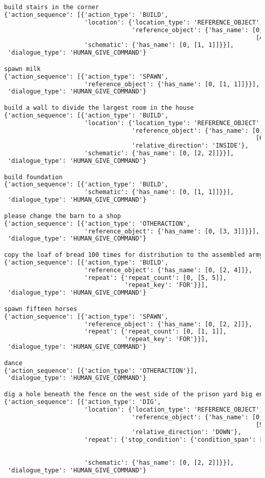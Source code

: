 \begin{lstlisting}[language=TeX]
build stairs in the corner
{'action_sequence': [{'action_type': 'BUILD',
                      'location': {'location_type': 'REFERENCE_OBJECT',
                                   'reference_object': {'has_name': [0,
                                                                     [4, 4]]}},
                      'schematic': {'has_name': [0, [1, 1]]}}],
 'dialogue_type': 'HUMAN_GIVE_COMMAND'}

spawn milk
{'action_sequence': [{'action_type': 'SPAWN',
                      'reference_object': {'has_name': [0, [1, 1]]}}],
 'dialogue_type': 'HUMAN_GIVE_COMMAND'}

build a wall to divide the largest room in the house
{'action_sequence': [{'action_type': 'BUILD',
                      'location': {'location_type': 'REFERENCE_OBJECT',
                                   'reference_object': {'has_name': [0,
                                                                     [6, 10]]},
                                   'relative_direction': 'INSIDE'},
                      'schematic': {'has_name': [0, [2, 2]]}}],
 'dialogue_type': 'HUMAN_GIVE_COMMAND'}

build foundation
{'action_sequence': [{'action_type': 'BUILD',
                      'schematic': {'has_name': [0, [1, 1]]}}],
 'dialogue_type': 'HUMAN_GIVE_COMMAND'}

please change the barn to a shop
{'action_sequence': [{'action_type': 'OTHERACTION',
                      'reference_object': {'has_name': [0, [3, 3]]}}],
 'dialogue_type': 'HUMAN_GIVE_COMMAND'}

copy the loaf of bread 100 times for distribution to the assembled army in front of you
{'action_sequence': [{'action_type': 'BUILD',
                      'reference_object': {'has_name': [0, [2, 4]]},
                      'repeat': {'repeat_count': [0, [5, 5]],
                                 'repeat_key': 'FOR'}}],
 'dialogue_type': 'HUMAN_GIVE_COMMAND'}

spawn fifteen horses
{'action_sequence': [{'action_type': 'SPAWN',
                      'reference_object': {'has_name': [0, [2, 2]]},
                      'repeat': {'repeat_count': [0, [1, 1]],
                                 'repeat_key': 'FOR'}}],
 'dialogue_type': 'HUMAN_GIVE_COMMAND'}

dance
{'action_sequence': [{'action_type': 'OTHERACTION'}],
 'dialogue_type': 'HUMAN_GIVE_COMMAND'}

dig a hole beneath the fence on the west side of the prison yard big enough for a person to crawl through
{'action_sequence': [{'action_type': 'DIG',
                      'location': {'location_type': 'REFERENCE_OBJECT',
                                   'reference_object': {'has_name': [0,
                                                                     [5, 13]]},
                                   'relative_direction': 'DOWN'},
                      'repeat': {'stop_condition': {'condition_span': [0,
                                                                       [14,
                                                                        21]]}},
                      'schematic': {'has_name': [0, [2, 2]]}}],
 'dialogue_type': 'HUMAN_GIVE_COMMAND'}


\end{lstlisting}

